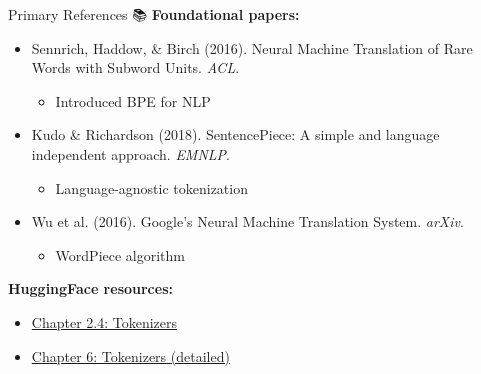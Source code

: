 \documentclass[aspectratio=169]{beamer}
\begin{document}
\begin{frame}[shrink=10]{Primary References 📚}
    \textbf{Foundational papers:}
    \begin{itemize}\setlength{\itemsep}{0pt}
        \item Sennrich, Haddow, \& Birch (2016). Neural Machine Translation of Rare Words with Subword Units. \textit{ACL}.
        \begin{itemize}\setlength{\itemsep}{0pt}
            \item Introduced BPE for NLP
        \end{itemize}

        \item Kudo \& Richardson (2018). SentencePiece: A simple and language independent approach. \textit{EMNLP}.
        \begin{itemize}\setlength{\itemsep}{0pt}
            \item Language-agnostic tokenization
        \end{itemize}

        \item Wu et al. (2016). Google's Neural Machine Translation System. \textit{arXiv}.
        \begin{itemize}\setlength{\itemsep}{0pt}
            \item WordPiece algorithm
        \end{itemize}
    \end{itemize}

    \vspace{0.5em}
    \textbf{HuggingFace resources:}
    \begin{itemize}\setlength{\itemsep}{0pt}
        \item \href{https://huggingface.co/learn/nlp-course/chapter2/4}{Chapter 2.4: Tokenizers}
        \item \href{https://huggingface.co/learn/nlp-course/chapter6}{Chapter 6: Tokenizers (detailed)}
    \end{itemize}
\end{frame}
\end{document}
